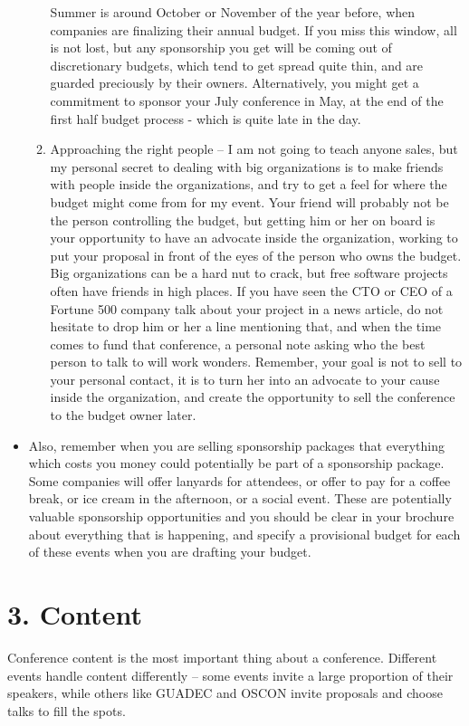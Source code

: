 \begin{itemize}
\begin{enumerate}
Summer is around October or November of the year before, when companies
are finalizing their annual budget.
If you miss this window, all is not lost, but any sponsorship you get
will be coming out of discretionary budgets, which tend to get spread
quite thin, and are guarded preciously by their owners. Alternatively,
you might get a commitment to sponsor your July conference in May, at
the end of the first half budget process - which is quite late in the day.
  \item Approaching the right people -- I am not going to teach anyone sales,
but my personal secret to dealing with big organizations is to make
friends with people inside the organizations, and try to get a feel for
where the budget might come from for my event. Your friend will probably
not be the person controlling the budget, but getting him or her on
board is your opportunity to have an advocate inside the organization,
working to put your proposal in front of the eyes of the person who owns
the budget.
Big organizations can be a hard nut to crack, but free software
projects often have friends in high places. If you have seen the CTO or
CEO of a Fortune 500 company talk about your project in a news article,
do not hesitate to drop him or her a line mentioning that, and when the time
comes to fund that conference, a personal note asking who the best
person to talk to will work wonders. Remember, your goal is not to sell
to your personal contact, it is to turn her into an advocate to your
cause inside the organization, and create the opportunity to sell the
conference to the budget owner later.
 \end{enumerate}
 \item Also, remember when you are selling sponsorship packages that everything
which costs you money could potentially be part of a sponsorship
package. Some companies will offer lanyards for attendees, or offer to
pay for a coffee break, or ice cream in the afternoon, or a social
event. These are potentially valuable sponsorship opportunities and you
should be clear in your brochure about everything that is happening, and
specify a provisional budget for each of these events when you are
drafting your budget.
\end{itemize}

\section*{3. Content}

Conference content is the most important thing about a conference.
Different events handle content differently -- some events invite a large
proportion of their speakers, while others like GUADEC and OSCON invite
proposals and choose talks to fill the spots.


